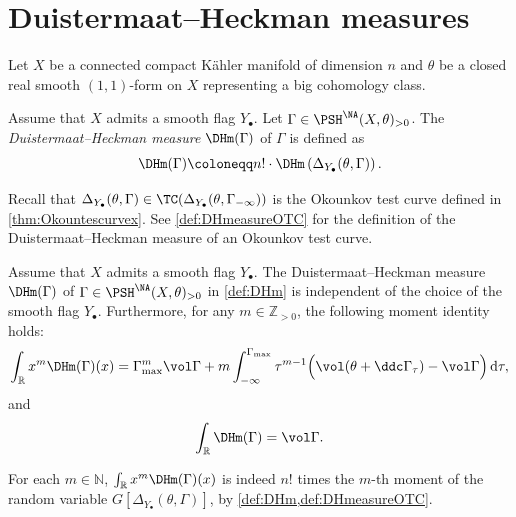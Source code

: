 \section{Duistermaat--Heckman measures}\label{sec:DHmeasure}
Let $X$ be a connected compact K\"ahler manifold of dimension $n$ and $\theta$ be a closed real smooth $(1,1)$-form on $X$ representing a big cohomology class.



\begin{definition}\label{def:DHm}
Assume that $X$ admits a smooth flag $Y_{\bullet}$. Let $\Gamma\in \PSH^{\NA}(X,\theta)_{>0}$.
    The \emph{Duistermaat--Heckman measure} $\DHm(\Gamma)$\index{$\DHm(\Gamma)$} of $\Gamma$ is defined as
    \[
    \DHm(\Gamma)\coloneqq n!\cdot \DHm\left(\Delta_{Y_{\bullet}}(\theta,\Gamma)\right).
    \]
\end{definition}
Recall that $\Delta_{Y_{\bullet}}(\theta,\Gamma)\in \TC(\Delta_{Y_{\bullet}}(\theta,\Gamma_{-\infty}))$ is the Okounkov test curve defined in \cref{thm:Okountescurvex}.
See \cref{def:DHmeasureOTC} for the definition of the Duistermaat--Heckman measure of an Okounkov test curve.

\begin{theorem}\label{thm:DHindep}
Assume that $X$ admits a smooth flag $Y_{\bullet}$.
    The Duistermaat--Heckman measure $\DHm(\Gamma)$ of $\Gamma\in \PSH^{\NA}(X,\theta)_{>0}$ in \cref{def:DHm} is independent of the choice of the smooth flag $Y_{\bullet}$. Furthermore, for any $m\in \mathbb{Z}_{>0}$, the following moment identity holds:
    \begin{equation}\label{eq:momentDHmtc1}
    \int_{\mathbb{R}}x^m\DHm(\Gamma)(x)=\Gamma_{\max}^m\vol \Gamma+m\int_{-\infty}^{\Gamma_{\max}}\tau^{m-1}\Bigl( \vol (\theta+\ddc \Gamma_{\tau})-\vol \Gamma \Bigr)\,\mathrm{d}\tau,
    \end{equation}
    and
    \begin{equation}\label{eq:momentDHmtc2}
        \int_{\mathbb{R}}\DHm(\Gamma)=\vol \Gamma.
    \end{equation}
\end{theorem}
For each $m\in \mathbb{N}$, $\int_{\mathbb{R}}x^m\DHm(\Gamma)(x)$ is indeed $n!$ times the $m$-th moment of the random variable $G[\Delta_{Y_{\bullet}}(\theta,\Gamma)]$, by \cref{def:DHm,def:DHmeasureOTC}.

